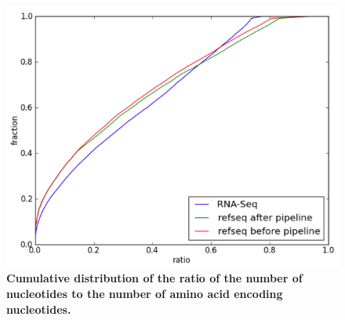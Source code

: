 \documentclass[10pt]{article}
\begin{document}
\begin{figure}[!ht]
\begin{center}
\includegraphics[width=5in]{figure13.png}
\end{center}
\caption{
{\bf Cumulative distribution of the ratio of the number of nucleotides to the number of amino acid encoding nucleotides.}
}
\label{figure13}
\end{figure}
\end{document}
